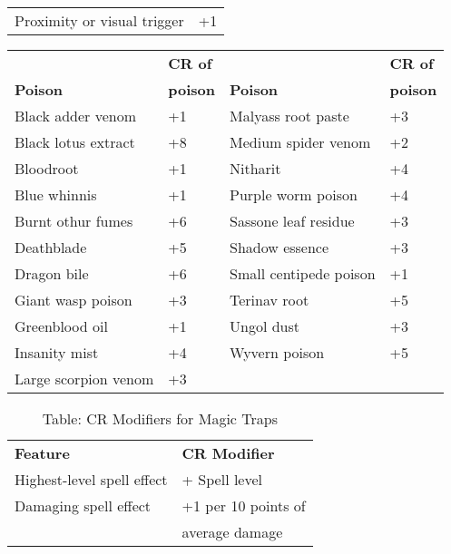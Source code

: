 \begin{table}[]
\begin{tabular}{ll}
Proximity or visual trigger & +1\\
\end{tabular}
\setlength{\tabcolsep}{1pt}
\begin{tabular}{ll|ll}
                & \textbf{CR of}  &                 & \textbf{CR of} \\
\textbf{Poison} & \textbf{poison} & \textbf{Poison} & \textbf{poison} \\
Black adder venom & +1 & Malyass root paste & +3\\
Black lotus extract & +8 & Medium spider venom & +2\\
Bloodroot & +1 & Nitharit & +4\\
Blue whinnis & +1 & Purple worm poison & +4\\
Burnt othur fumes & +6 & Sassone leaf residue & +3\\
Deathblade & +5 & Shadow essence & +3\\
Dragon bile & +6 & Small centipede poison & +1\\
Giant wasp poison & +3 & Terinav root & +5\\
Greenblood oil & +1 & Ungol dust & +3\\
Insanity mist & +4 & Wyvern poison & +5\\
Large scorpion venom & +3  &  \\
\end{tabular}
\end{table}

\begin{table}[]
\sffamily
\caption{Table: CR Modifiers for Magic Traps}
\begin{tabular}{ll}
\textbf{Feature} & \textbf{CR Modifier}\\
Highest-level spell effect & + Spell level \\
Damaging spell effect & +1 per 10 points of\\
                      & average damage\\
\end{tabular}
\end{table}

